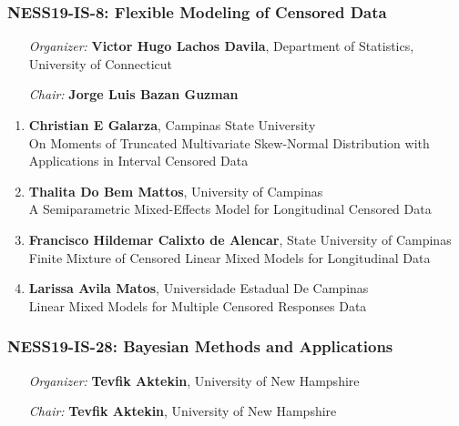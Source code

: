 \subsubsection*{NESS19-IS-8: Flexible Modeling of Censored Data}

\begin{enumerate}[align=left]
\item [\emph{Organizer:}] \textbf{Victor Hugo Lachos Davila}, Department of Statistics, University of Connecticut
\item [\emph{Chair:}] \textbf{Jorge Luis Bazan Guzman}
\end{enumerate}

\begin{enumerate}
\item \textbf{Christian E Galarza}, Campinas State University \\
On Moments of Truncated Multivariate Skew-Normal Distribution with Applications in Interval Censored Data
\item \textbf{Thalita Do Bem Mattos}, University of Campinas \\
A Semiparametric Mixed-Effects Model for Longitudinal  Censored Data
\item \textbf{Francisco Hildemar Calixto de Alencar}, State University of Campinas \\
Finite Mixture of Censored Linear Mixed Models for Longitudinal Data
\item \textbf{Larissa Avila Matos}, Universidade Estadual De Campinas \\
Linear Mixed Models for Multiple Censored Responses Data
\end{enumerate}

\subsubsection*{NESS19-IS-28: Bayesian Methods and Applications}

\begin{enumerate}[align=left]
\item [\emph{Organizer:}] \textbf{Tevfik Aktekin}, University of New Hampshire
\item [\emph{Chair:}] \textbf{Tevfik Aktekin}, University of New Hampshire
\end{enumerate}

